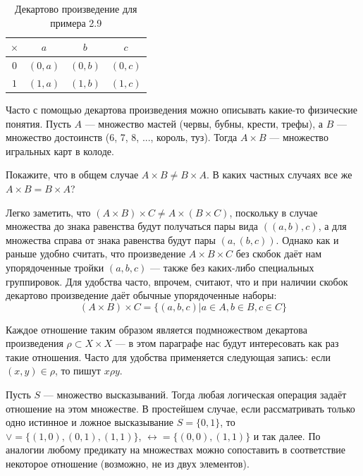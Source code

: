 \begin{table}[h]
\centering
\begin{tabular}{c|ccc}
$\times$ & $a$ & $b$ & $c$ \\
\hline
$0$ & $(0, a)$ & $(0, b)$ & $(0, c)$ \\
$1$ & $(1, a)$ & $(1, b)$ & $(1, c)$
\end{tabular}
\caption{Декартово произведение для примера 2.9}
\end{table}

\begin{example}
Часто с помощью декартова произведения можно описывать какие-то физические понятия. Пусть $A$ — множество мастей (червы, бубны, крести, трефы), а $B$ — множество достоинств (6, 7, 8, ..., король, туз). Тогда $A \times B$ — множество игральных карт в колоде.
\end{example}

\begin{exercise}
Покажите, что в общем случае $A\times B \not = B \times A$. В каких частных случаях все же $A\times B = B \times A$?
\end{exercise}

Легко заметить, что $(A\times B)\times C \not= A\times (B \times C)$, поскольку в случае множества до знака равенства будут получаться пары вида $((a, b), c)$, а для множества справа от знака равенства будут пары $(a, (b, c))$. Однако как и раньше удобно считать, что произведение $A\times B\times C$ без скобок даёт нам упорядоченные тройки $(a, b, c)$ — также без каких-либо специальных группировок. Для удобства часто, впрочем, считают, что и при наличии скобок декартово произведение даёт обычные упорядоченные наборы: 
$$(A\times B)\times C = \{(a, b, c)|a\in A, b\in B, c\in C\}$$

Каждое отношение таким образом является подмножеством декартова произведения $\rho \subset X\times X$ — в этом параграфе нас будут интересовать как раз такие отношения. Часто для удобства применяется следующая запись: если $(x, y) \in \rho$, то пишут $x\rho y$.

\begin{example}
Пусть $S$ — множество высказываний. Тогда любая логическая операция задаёт отношение на этом множестве. В простейшем случае, если рассматривать только одно истинное и ложное высказывание $S = \{0, 1\}$, то $\vee = \{(1, 0), (0, 1), (1, 1)\}$, $\leftrightarrow = \{(0, 0), (1, 1)\}$ и так далее. По аналогии любому предикату на множествах можно сопоставить в соответствие некоторое отношение (возможно, не из двух элементов).
\end{example}

